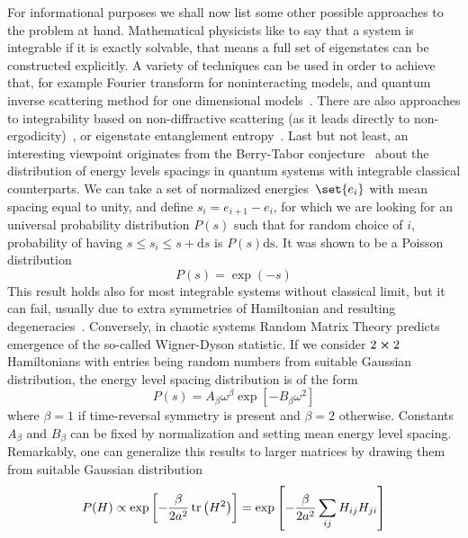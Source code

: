 For informational purposes we shall now list some other possible approaches to the problem at
hand. Mathematical physicists like to say that a system is integrable if it is exactly
solvable, that means a full set of eigenstates can be constructed explicitly. A variety
of techniques can be used in order to achieve that, for example Fourier transform for
noninteracting models, and quantum inverse scattering method for one dimensional 
models~\autocite{Faddeev1996,Korepin1993,Ilievski2014}. There are also approaches
to integrability based on non-diffractive scattering (as it leads directly 
to non-ergodicity)~\autocite{Sutherland2004}, or eigenstate entanglement entropy~\autocite{ydzba2020}.
Last but not least, an interesting viewpoint originates from the Berry-Tabor conjecture~\autocite{Berry1977} about the
distribution of energy levels spacings in quantum systems with integrable classical counterparts.
We can take a set of normalized energies~\(\set{e_i}\) with mean spacing equal to unity,
and define \(s_i = e_{i+1}-e_i\), for which we are looking for an universal probability
distribution \(P(s)\) such that for random choice of \(i\), probability of having
\(s \leq s_i \leq s+\mathrm{d}s\) is \(P(s)\mathrm{ds}\). It was shown to be a Poisson
distribution~\autocite{Ott2002}
\begin{equation}
    P(s) = \exp(-s)
\end{equation}
This result holds also for most integrable systems without classical limit, but it can fail,
usually due to extra symmetries of Hamiltonian and resulting degeneracies~\autocite{DAlessio2016}.
Conversely, in chaotic systems Random Matrix Theory predicts emergence of the so-called Wigner-Dyson
statistic. If we consider \(2\cross 2\) Hamiltonians with entries being random numbers from suitable
Gaussian distribution, the energy level spacing distribution is of the form~\autocite{DAlessio2016}
\begin{equation}
    P(s) = A_{\beta} \omega^{\beta} \exp\left[-B_{\beta} \omega^2\right]
\end{equation}
where \(\beta = 1\) if time-reversal symmetry is present and \(\beta = 2\) otherwise.
Constants \(A_{\beta}\) and \(B_{\beta}\) can be fixed by normalization and setting mean energy level
spacing. Remarkably, one can generalize this results to larger matrices by drawing
them from suitable Gaussian distribution~\autocite{Alhassid2000}
\begin{equation}
    P(H) \propto \exp\left[-\frac{\beta}{2a^2}\tr\left(H^2\right)\right] =
    \exp\left[-\frac{\beta}{2a^2}\sum_{ij} H_{ij}H_{ji}\right]
    \label{eq:GOE}
\end{equation}
